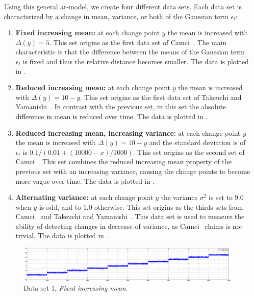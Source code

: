 Using this general \gls{ar}-model, we create four different data sets.
Each data set is characterized by a change in mean, variance, or both of the Gaussian term $\epsilon_t$:
\begin{enumerate}
  \item \textbf{Fixed increasing mean:} at each change point $y$ the mean is increased with $\Delta(y) = 5$.
  This set origins as the first data set of Camci~\cite{camci2010change}.
  The main characteristic is that the difference between the means of the Gaussian term $\epsilon_t$ is fixed and thus the relative distance becomes smaller.
  The data is plotted in .

  \item \textbf{Reduced increasing mean:} at each change point $y$ the mean is increased with $\Delta(y) = 10 - y$.
  This set origins as the first data set of Takeuchi and Yamanishi~\cite{takeuchi2006unifying}.
  In contrast with the previous set, in this set the absolute difference in mean is reduced over time.
  The data is plotted in .

  \item \textbf{Reduced increasing mean, increasing variance:} at each change point $y$ the mean is increased with $\Delta(y) = 10 - y$ and the standard deviation is of $\epsilon_t$ is $0.1 / (0.01 + (10000 - x)/1000)$.
  This set origins as the second set of Camci~\cite{camci2010change}.
  This set combines the reduced increasing mean property of the previous set with an increasing variance, causing the change points to become more vague over time.
  The data is plotted in .

  \item \textbf{Alternating variance:} at each change point $y$ the variance $\sigma^2$ is set to $9.0$ when $y$ is odd, and to $1.0$ otherwise.
  This set origins as the thirds sets from Camci~\cite{camci2010change} and Takeuchi and Yamanishi~\cite{takeuchi2006unifying}.
  This data set is used to measure the ability of detecting changes in decrease of variance, as Camci~\cite{camci2010change} claims is not trivial.
  The data is plotted in .
\end{enumerate}

\begin{figure}
\centering
  \includegraphics[width=1\textwidth]{./Figures/chapter5/set_1_data.eps}
  \caption[Fixed increasing mean]{Data set 1, \emph{Fixed increasing mean}.}
  \label{fig:camci_fixed_increasing_mean}
\end{figure}

